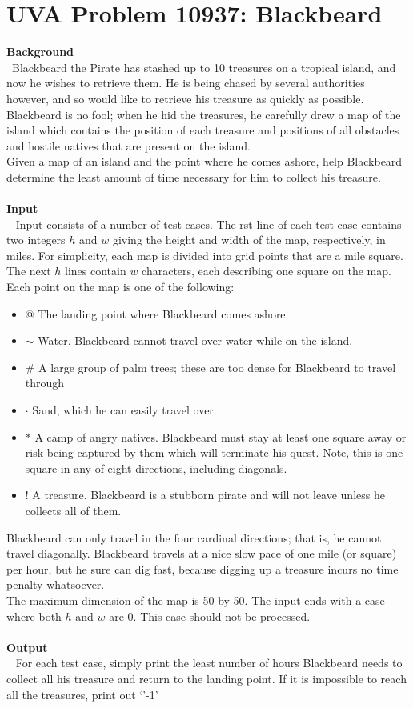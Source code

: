 \documentclass[12pt]{article}
\begin{document}
\section{UVA Problem 10937: Blackbeard}
\textbf{Background} \\
~\indent Blackbeard the Pirate has stashed up to 10 treasures on a tropical
island, and now he wishes to retrieve them.  He is being chased
by several authorities however, and so would like to retrieve his
treasure as quickly as possible. Blackbeard is no fool; when he hid
the treasures, he carefully drew a map of the island which contains
the position of each treasure and positions of all obstacles and hostile
natives that are present on the island. \\
\indent Given a map of an island and the point where he comes ashore,
help Blackbeard determine the least amount of time necessary for
him to collect his treasure. \\ \\
\textbf{Input} \\
~ \indent Input consists of a number of test cases. The  rst line of each test
case contains two integers $h$ and $w$ giving the height and width of
the map, respectively, in miles. For simplicity, each map is divided
into grid points that are a mile square. The next $h$ lines contain $w$
characters, each describing one square on the map. Each point on
the map is one of the following:
\begin{itemize}
    \item @ The landing point where Blackbeard comes ashore.
    \item $\sim$ Water. Blackbeard cannot travel over water while on the island.
    \item \# A large group of palm trees; these are too dense for Blackbeard to travel through
    \item $\cdot$ Sand, which he can easily travel over.
    \item $\ast$ A camp of angry natives.  Blackbeard must stay at least one square away or risk
    being captured by them which will terminate his quest. Note, this is one square in any of
    eight directions, including diagonals.
    \item ! A treasure. Blackbeard is a stubborn pirate and will not leave unless he
    collects all of them.
\end{itemize}
\indent Blackbeard can only travel in the four cardinal directions; that is, he cannot travel
diagonally. Blackbeard travels at a nice slow pace of one mile (or square) per hour, but he sure
can dig fast, because digging up a treasure incurs no time penalty whatsoever. \\
\indent The maximum dimension of the map is 50 by 50. The input ends with a case where both
$h$ and $w$ are 0. This case should not be processed. \\ \\
\textbf{Output} \\
~ \indent For each test case, simply print the least number of hours Blackbeard needs to
collect all his treasure and return to the landing point. If it is impossible to reach all
the treasures, print out `'-1'
\end{document}
